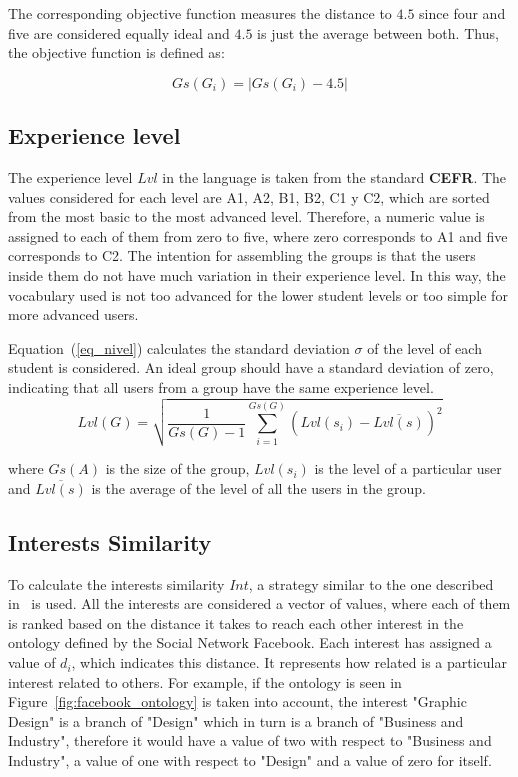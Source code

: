 The corresponding objective function measures the distance to $4.5$ since four and five are considered equally ideal and $4.5$ is just the average between both. Thus, the objective function is defined as:

\begin{equation} \label{eq_group_size}
    Gs(G_i) = | Gs(G_i) - 4.5 |
\end{equation}

\subsection{Experience level}

The experience level $Lvl$ in the language is taken from the standard \textbf{CEFR}. The values considered for each level are A1, A2, B1, B2, C1 y C2, which are sorted from the most basic to the most advanced level. Therefore, a numeric value is assigned to each of them from zero to five, where zero corresponds to A1 and five corresponds to C2. The intention for assembling the groups is that the users inside them do not have much variation in their experience level. 
In this way, the vocabulary used is not too advanced for the lower student levels or too simple for more advanced users. 

Equation~(\ref{eq_nivel}) calculates the standard deviation $\sigma$ of the level of each student is considered. An ideal group should have a standard deviation of zero, indicating that all users from a group have the same experience level.\\

\begin{equation} \label{eq_nivel}
    Lvl(G) = \sqrt{\frac{1}{Gs(G)-1} \sum_{i=1}^{Gs(G)} (Lvl(s_i) - \overline{Lvl(s)})^2}
\end{equation}

where $Gs(A)$ is the size of the group, $Lvl(s_i)$ is the level of a particular user and $\overline{Lvl(s)}$ is the average of the level of all the users in the group.

\subsection{Interests Similarity}
\label{subsection:interests_similarity}

To calculate the interests similarity $Int$, a strategy similar to the one described in~\cite{taxonomy_semantic_similarity} is used. All the interests are considered a vector of values, where each of them is ranked based on the distance it takes to reach each other interest in the ontology defined by the Social Network Facebook. Each interest has assigned a value of $d_i$, which indicates this distance. It represents how related is a particular interest related to others. For example, if the ontology is seen in Figure~\ref{fig:facebook_ontology} is taken into account, the interest "Graphic Design" is a branch of "Design" which in turn is a branch of "Business and Industry", therefore it would have a value of two with respect to "Business and Industry", a value of one with respect to "Design" and a value of zero for itself. \\

